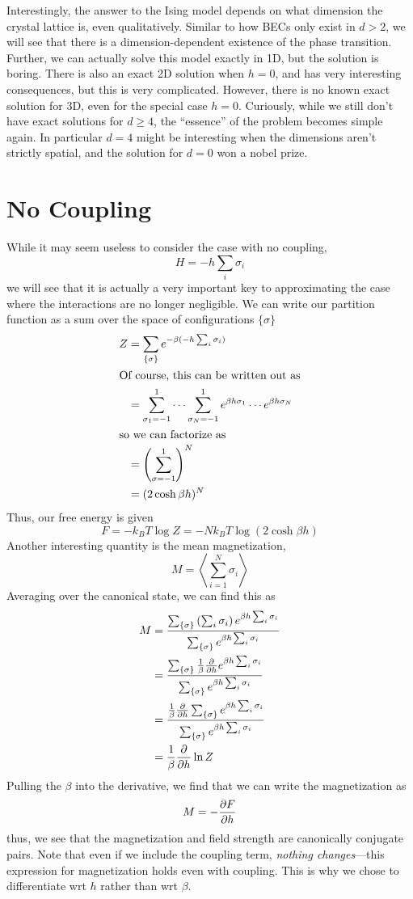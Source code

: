 Interestingly, the answer to the Ising model depends on what dimension the crystal lattice is, even qualitatively. Similar to how BECs only exist in \(d>2\), we will see that there is a dimension-dependent existence of the phase transition. Further, we can actually solve this model exactly in 1D, but the solution is boring. There is also an exact 2D solution when \(h=0\), and has very interesting consequences, but this is very complicated. However, there is no known exact solution for 3D, even for the special case \(h=0\). Curiously, while we still don't have exact solutions for \(d\geq 4\), the ``essence'' of the problem becomes simple again. In particular \(d=4\) might be interesting when the dimensions aren't strictly spatial, and the solution for \(d=0\) won a nobel prize.

\section{No Coupling}
While it may seem useless to consider the case with no coupling,
\[H = -h\sum_i\sigma_i\]
we will see that it is actually a very important key to approximating the case where the interactions are no longer negligible. We can write our partition function as a sum over the space of configurations \(\{\sigma\}\)
\begin{align*}
	Z &= \sum_{\{\sigma\}} e^{-\beta(-h\sum_i\sigma_i)}\\
	\intertext{Of course, this can be written out as}
	  &=\sum_{\sigma_1=-1}^1\cdots\sum_{\sigma_N=-1}^1e^{\beta h\sigma_1}\cdots e^{\beta h\sigma_N}\\
	  \intertext{so we can factorize as}
	  &=\left(\sum_{\sigma=-1}^1\right)^N\\
	  &=(2\cosh \beta h)^N
\end{align*}
Thus, our free energy is given
\[F = -k_BT\log Z = -Nk_BT\log(2\cosh\beta h)\]
Another interesting quantity is the mean magnetization, 
\[M = \left\langle \sum_{i=1}^N\sigma_i\right\rangle\]
Averaging over the canonical state,  we can find this as
\begin{align*}
	M&=\frac{\sum_{\{\sigma\}}\left(\sum_i \sigma_i\right)e^{\beta h\sum_i\sigma_i}}{\sum_{\{\sigma\}}e^{\beta\hbar \sum_i \sigma_i}}\\
	 &=\frac{\sum_{\{\sigma\}}\frac{1}{\beta}\frac{\partial }{\partial h}e^{\beta h\sum_i\sigma_i}}{\sum_{\{\sigma\}} e^{\beta h\sum_i\sigma_i}}\\
	 &=\frac{\frac{1}{\beta}\frac{\partial }{\partial h}\sum_{\{\sigma\}}e^{\beta h\sum_i\sigma_i}}{\sum_{\{\sigma\}}e^{\beta h\sum_i \sigma_i}}\\
	 &=\frac{1}{\beta}\frac{\partial }{\partial h}\ln Z\\
\end{align*}
Pulling the \(\beta\) into the derivative, we find that we can write the magnetization as 
\begin{equation}
	M = -\frac{\partial F}{\partial h}
\end{equation}
thus, we see that the magnetization and field strength are canonically conjugate pairs. Note that even if we include the coupling term, \emph{nothing changes}---this expression for magnetization holds even with coupling. This is why we chose to differentiate wrt \(h\) rather than wrt \(\beta\).

